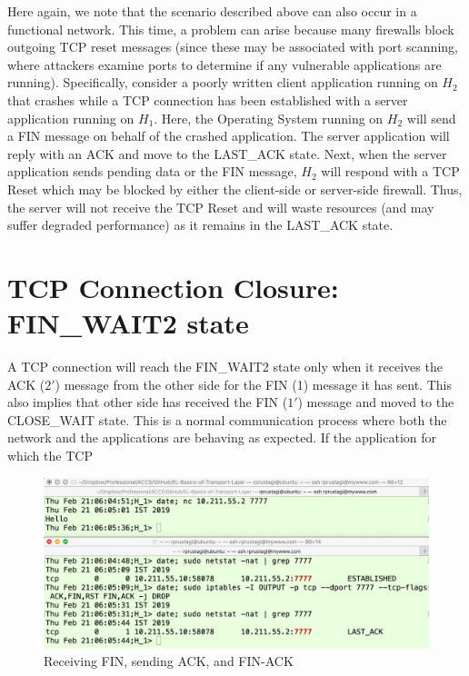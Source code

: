 \begin{multicols}{2}
Here again, we note that the scenario described above can also occur in a functional network. This time, a problem can arise because many firewalls block outgoing TCP reset messages (since these may be associated with port scanning, where attackers examine ports to determine if any vulnerable applications are running). Specifically, consider a poorly written client application running on $H_{2}$ that crashes while a TCP connection has been established with a server application running on $H_{1}$. Here, the Operating System running on $H_{2}$ will send a FIN message on behalf of the crashed application. The server application will reply with an ACK and move to the LAST\_ACK state. Next, when the server application sends pending data or the FIN message, $H_{2}$ will respond with a TCP Reset which may be blocked by either the client-side or server-side firewall. Thus, the server will not receive the TCP Reset and will waste resources (and may suffer degraded performance) as it remains in the LAST\_ACK state.

\section*{TCP Connection Closure: FIN\_WAIT2 state}

{\parfillskip=0pt
A TCP connection will reach the FIN\_WAIT2 state only when it receives the ACK ($2'$) message from the other side for the FIN (1) message it has sent. This also implies that other side has received the FIN ($1'$) message and moved to the CLOSE\_WAIT state. This is a normal communication process where both the network and the applications are behaving as expected. If the application for which the TCP\par}
\end{multicols}

\begin{figure}[!htb]
\centering
\includegraphics[scale=.22]{src/Figures/chap3/10.jpg}
\caption{Receiving FIN, sending ACK, and FIN-ACK}\label{chap3-fig10}
\end{figure}

